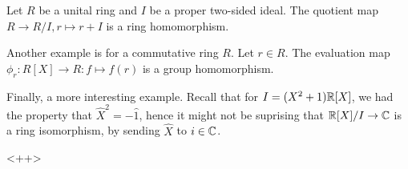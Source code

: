 \begin{example}
  Let $R$ be a unital ring and $I$ be a proper two-sided ideal. The quotient map $R\to
  R/I, r\mapsto r+I$ is a ring homomorphism.

  Another example is for a commutative ring $R$. Let $r\in R$. The evaluation map
  $\phi_r:R[X]\to R:f\mapsto f(r)$ is a group homomorphism.

  Finally, a more interesting example. Recall that for $I=(X^2+1)\mathbb R[X]$, we had the
  property that $\hat{X}^2=-\hat{1}$, hence it might not be suprising that
  $\mathbb R[X]/I\to\mathbb C$ is a ring isomorphism, by sending $\hat{X}$ to $i\in\mathbb C$.
\end{example}<++>
